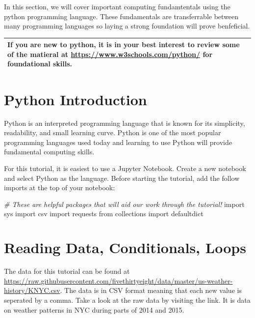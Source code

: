 \documentclass[]{book}
\newenvironment{Shaded}{\begin{snugshade}}{\end{snugshade}}
\newcommand{\ImportTok}[1]{#1}
\newcommand{\CommentTok}[1]{\textcolor[rgb]{0.56,0.35,0.01}{\textit{#1}}}
\newcommand{\NormalTok}[1]{#1}
\begin{document}
In this section, we will cover important computing fundamtentals using
the python programming language. These fundamentals are transferrable
between many programming languages so laying a strong foundation will
prove benfeficial.

\begin{longtable}[]{@{}l@{}}
\toprule
If you are new to python, it is in your best interest to review some of
the matieral at \url{https://www.w3schools.com/python/} for foundational
skills.\tabularnewline
\bottomrule
\end{longtable}

\section{Python Introduction}\label{python-introduction}

Python is an interpreted programming language that is known for its
simplicity, readability, and small learning curve. Python is one of the
most popular programming languages used today and learning to use Python
will provide fundamental computing skills.

For this tutorial, it is easiest to use a Jupyter Notebook. Create a new
notebook and select Python as the language. Before starting the
tutorial, add the follow imports at the top of your notebook:

\begin{Shaded}
\begin{Highlighting}[]
\CommentTok{# These are helpful packages that will aid our work through the tutorial!}
\ImportTok{import}\NormalTok{ sys}
\ImportTok{import}\NormalTok{ csv}
\ImportTok{import}\NormalTok{ requests}
\ImportTok{from}\NormalTok{ collections }\ImportTok{import}\NormalTok{ defaultdict}
\end{Highlighting}
\end{Shaded}

\section{Reading Data, Conditionals,
Loops}\label{reading-data-conditionals-loops}

The data for this tutorial can be found at
\url{https://raw.githubusercontent.com/fivethirtyeight/data/master/us-weather-history/KNYC.csv}.
The data is in CSV format meaning that each new value is seperated by a
comma. Take a look at the raw data by visiting the link. It is data on
weather patterns in NYC during parts of 2014 and 2015.
\end{document}

